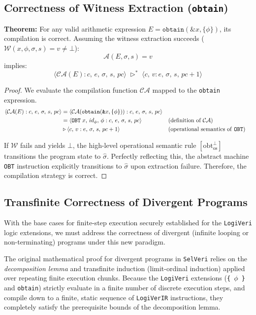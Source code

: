 \documentclass{article}
\begin{document}
\subsection{Correctness of Witness Extraction (\texttt{obtain})}

\textbf{Theorem:} For any valid arithmetic expression $E = \mathtt{obtain}(\texttt{\&}x, \{ \phi \})$, its compilation is correct. Assuming the witness extraction succeeds ($\mathcal{W}(x, \phi, \sigma, s) = v \neq \bot$):
\[
\mathcal{A}(E, \sigma, s) = v
\]
implies:
\[
\langle \mathcal{CA}(E) : c,\, e,\, \sigma,\, s,\, pc \rangle \; \triangleright^{\ast} \; \langle c,\, v : e,\, \sigma,\, s,\, pc + 1 \rangle
\]

\begin{proof}
We evaluate the compilation function $\mathcal{CA}$ mapped to the \texttt{obtain} expression.
\[
\begin{aligned}
\langle \mathcal{CA}(E) : c,\, e,\, \sigma,\, s,\, pc \rangle 
&= \langle \mathcal{CA}(\mathtt{obtain}(\texttt{\&}x, \{ \phi \})) : c,\, e,\, \sigma,\, s,\, pc \rangle \\
&= \langle \mathtt{OBT}\; x,\, id_\phi,\, \phi : c,\, e,\, \sigma,\, s,\, pc \rangle && \text{(definition of $\mathcal{CA}$)} \\
&\triangleright \langle c,\, v : e,\, \sigma,\, s,\, pc + 1 \rangle && \text{(operational semantics of \texttt{OBT})}
\end{aligned}
\]

If $\mathcal{W}$ fails and yields $\bot$, the high-level operational semantic rule $[\text{obt}^{\bot}_{\text{os}}]$ transitions the program state to $\hat{\sigma}$. Perfectly reflecting this, the abstract machine \texttt{OBT} instruction explicitly transitions to $\hat{\sigma}$ upon extraction failure. Therefore, the compilation strategy is correct.
\end{proof}

\subsection{Transfinite Correctness of Divergent Programs}

With the base cases for finite-step execution securely established for the \texttt{LogiVeri} logic extensions, we must address the correctness of divergent (infinite looping or non-terminating) programs under this new paradigm. 

The original mathematical proof for divergent programs in \texttt{SelVeri} relies on the \textit{decomposition lemma} and transfinite induction (limit-ordinal induction) applied over repeating finite execution chunks. Because the \texttt{LogiVeri} extensions (\texttt{\{ $\phi$ \}} and \texttt{obtain}) strictly evaluate in a finite number of discrete execution steps, and compile down to a finite, static sequence of \texttt{LogiVerIR} instructions, they completely satisfy the prerequisite bounds of the decomposition lemma. 
\end{document}
